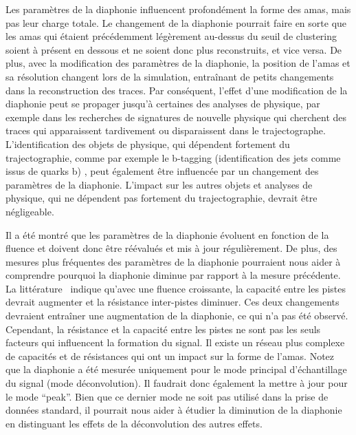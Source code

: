 Les paramètres de la diaphonie influencent profondément la forme des amas, mais pas leur charge totale. Le changement de la diaphonie pourrait faire en sorte que les amas qui étaient précédemment légèrement au-dessus du seuil de clustering soient à présent en dessous et ne soient donc plus reconstruits, et vice versa. De plus, avec la modification des paramètres de la diaphonie, la position de l'amas et sa résolution changent lors de la simulation, entraînant de petits changements dans la reconstruction des traces. Par conséquent, l'effet d'une modification de la diaphonie peut se propager jusqu'à certaines des analyses de physique, par exemple dans les recherches de signatures de nouvelle physique qui cherchent des traces qui apparaissent tardivement ou disparaissent dans le trajectographe. L'identification des objets de physique, qui dépendent fortement du trajectographie, comme par exemple le b-tagging (identification des jets comme issus de quarks b) , peut également être influencée par un changement des paramètres de la diaphonie. L'impact sur les autres objets et analyses de physique, qui ne dépendent pas fortement du trajectographie, devrait être négligeable.


Il a été montré que les paramètres de la diaphonie évoluent en fonction de la fluence et doivent donc être réévalués et mis à jour régulièrement. De plus, des mesures plus fréquentes des paramètres de la diaphonie pourraient nous aider à comprendre pourquoi la diaphonie diminue par rapport à la mesure précédente. La littérature~\cite{Hartmann:2017gzy} indique qu'avec une fluence croissante, la capacité entre les pistes devrait augmenter et la résistance inter-pistes diminuer. Ces deux changements devraient entraîner une augmentation de la diaphonie, ce qui n’a pas été observé. Cependant, la résistance et la capacité entre les pistes ne sont pas les seuls facteurs qui influencent la formation du signal. Il existe un réseau plus complexe de capacités et de résistances qui ont un impact sur la forme de l'amas. Notez que la diaphonie a été mesurée uniquement pour le mode principal d'échantillage du signal (mode déconvolution). Il faudrait donc également la mettre à jour pour le mode ``peak''. Bien que ce dernier mode ne soit pas utilisé dans la prise de données standard, il pourrait nous aider à étudier la diminution de la diaphonie en distinguant les effets de la déconvolution des autres effets.

